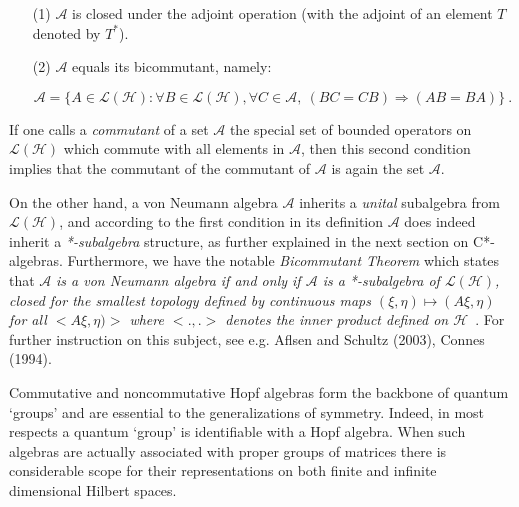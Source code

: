 \documentclass[12pt]{article}
\theoremstyle{plain}
\theoremstyle{definition}
\numberwithin{equation}{section}
\newcommand{\A}{\mathcal A}
\renewcommand{\H}{\mathcal H}
\renewcommand{\cL}{\mathcal L}
\begin{document}
\begin{itemize}

\item[(1)] $\A$ is closed under the adjoint operation (with the
adjoint of an element $T$ denoted by $T^*$).


\item[(2)]
$\A$ equals its bicommutant, namely:

\begin{equation}
\A= \{A \in \cL(\H) : \forall B \in \cL(\H), \forall C\in \A,~
(BC=CB)\Rightarrow (AB=BA)\}~.
\end{equation}
\end{itemize}

If one calls a \emph{commutant} of a set $\A$ the special set of
bounded operators on $\cL(\H)$ which commute with all elements in
$\A$, then this second condition implies that the commutant of the
commutant of $\A$ is again the set $\A$.


On the other hand, a von Neumann algebra $\A$ inherits a
\emph{unital} subalgebra from $\cL(\H)$, and according to the
first condition in its definition $\A$ does indeed inherit a
\emph{*-subalgebra} structure, as further explained in the next
section on C*-algebras. Furthermore, we have the notable
\emph{Bicommutant Theorem} which states that $\A$ \emph{is a von
Neumann algebra if and only if $\A$ is a *-subalgebra of
$\cL(\H)$, closed for the smallest topology defined by continuous
maps $(\xi,\eta)\longmapsto (A\xi,\eta)$ for all $<A\xi,\eta)>$
where $<.,.>$ denotes the inner product defined on $\H$}~. For
further instruction on this subject, see e.g. Aflsen and Schultz
(2003), Connes (1994). 

 
Commutative and noncommutative Hopf algebras form the backbone of
quantum `groups' and are essential to the generalizations of
symmetry. Indeed, in most respects a quantum `group' is identifiable
with a Hopf algebra. When such algebras are actually
associated with proper groups of matrices there is
considerable scope for their representations on both finite
and infinite dimensional Hilbert spaces.
\end{document}
